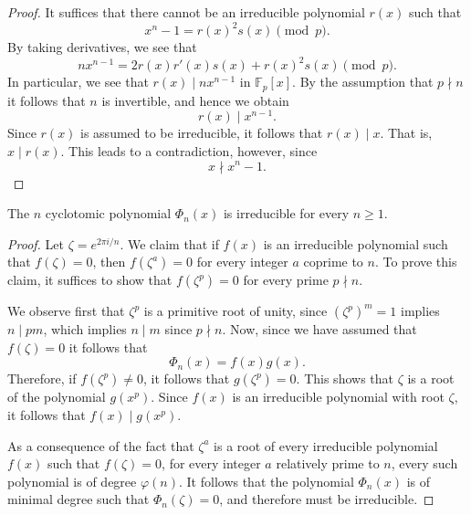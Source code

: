 \begin{proof}
  It suffices that there cannot be an irreducible polynomial $r(x)$ such that
  \begin{equation*}
    x^n-1=r(x)^2s(x)\pmod{p}.
  \end{equation*}
  By taking derivatives, we see that
  \begin{equation*}
    nx^{n-1}=2r(x)r'(x)s(x)+r(x)^2s(x)\pmod{p}.
  \end{equation*}
  In particular, we see that $r(x)\mid nx^{n-1}$ in $\mathbb{F}_p[x]$. By the assumption that $p\nmid n$ it follows that $n$ is invertible, and hence we obtain
  \begin{equation*}
    r(x)\mid x^{n-1}.
  \end{equation*}
  Since $r(x)$ is assumed to be irreducible, it follows that $r(x)\mid x$. That is, $x\mid r(x)$. This leads to a contradiction, however, since
  \begin{equation*}
    x\nmid x^n-1.
  \end{equation*}
\end{proof}

\begin{theorem}
  The $n$\supth{} cyclotomic polynomial $\Phi_n(x)$ is irreducible for every $n\geq 1$.
\end{theorem}

\begin{proof}
  Let $\zeta=e^{2\pi i/n}$. We claim that if $f(x)$ is an irreducible polynomial such that $f(\zeta)=0$, then $f(\zeta^a)=0$ for every integer $a$ coprime to $n$. To prove this claim, it suffices to show that $f(\zeta^p)=0$ for every prime $p\nmid n$. 

  We observe first that $\zeta^p$ is a primitive root of unity, since $(\zeta^p)^m=1$ implies $n\mid pm$, which implies $n\mid m$ since $p\nmid n$. Now, since we have assumed that $f(\zeta)=0$ it follows that
  \begin{equation*}
    \Phi_n(x)=f(x)g(x).
  \end{equation*}
Therefore, if $f(\zeta^p)\neq 0$, it follows that $g(\zeta^p)=0$. This shows that $\zeta$ is a root of the polynomial $g(x^p)$. Since $f(x)$ is an irreducible polynomial with root $\zeta$, it follows that $f(x)\mid g(x^p)$.

  As a consequence of the fact that $\zeta^a$ is a root of every irreducible polynomial $f(x)$ such that $f(\zeta)=0$, for every integer $a$ relatively prime to $n$, every such polynomial is of degree $\varphi(n)$. It follows that the polynomial $\Phi_n(x)$ is of minimal degree such that $\Phi_n(\zeta)=0$, and therefore must be irreducible.
\end{proof}

